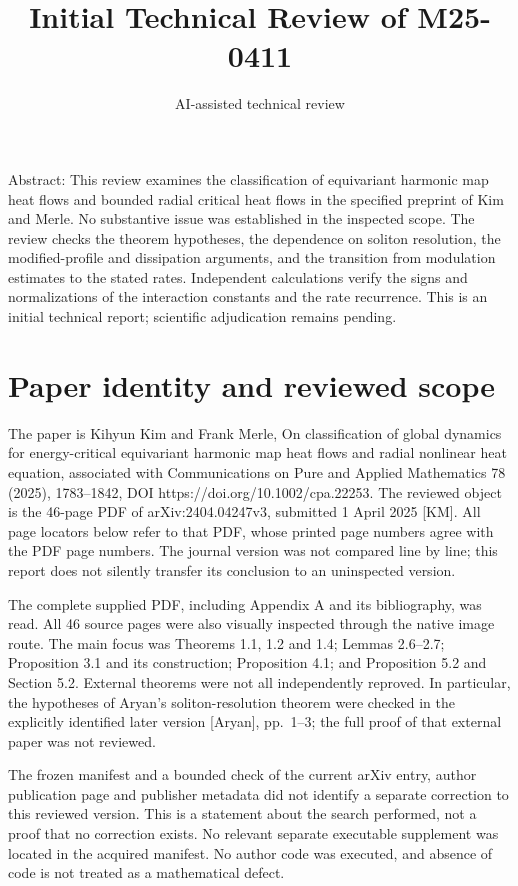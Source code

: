\documentclass[10pt]{article}
\title{Initial Technical Review of M25-0411}
\author{AI-assisted technical review}
\date{}
\begin{document}
\maketitle
Abstract: This review examines the classification of equivariant harmonic map heat flows and bounded radial critical heat flows in the specified preprint of Kim and Merle. No substantive issue was established in the inspected scope. The review checks the theorem hypotheses, the dependence on soliton resolution, the modified-profile and dissipation arguments, and the transition from modulation estimates to the stated rates. Independent calculations verify the signs and normalizations of the interaction constants and the rate recurrence. This is an initial technical report; scientific adjudication remains pending.\par
\section*{Paper identity and reviewed scope}
The paper is Kihyun Kim and Frank Merle, On classification of global dynamics for energy-critical equivariant harmonic map heat flows and radial nonlinear heat equation, associated with Communications on Pure and Applied Mathematics 78 (2025), 1783–1842, DOI https://doi.org/10.1002/cpa.22253. The reviewed object is the 46-page PDF of arXiv:2404.04247v3, submitted 1 April 2025 [KM]. All page locators below refer to that PDF, whose printed page numbers agree with the PDF page numbers. The journal version was not compared line by line; this report does not silently transfer its conclusion to an uninspected version.\par
The complete supplied PDF, including Appendix A and its bibliography, was read. All 46 source pages were also visually inspected through the native image route. The main focus was Theorems 1.1, 1.2 and 1.4; Lemmas 2.6–2.7; Proposition 3.1 and its construction; Proposition 4.1; and Proposition 5.2 and Section 5.2. External theorems were not all independently reproved. In particular, the hypotheses of Aryan’s soliton-resolution theorem were checked in the explicitly identified later version [Aryan], pp. 1–3; the full proof of that external paper was not reviewed.\par
The frozen manifest and a bounded check of the current arXiv entry, author publication page and publisher metadata did not identify a separate correction to this reviewed version. This is a statement about the search performed, not a proof that no correction exists. No relevant separate executable supplement was located in the acquired manifest. No author code was executed, and absence of code is not treated as a mathematical defect.\par
\end{document}
